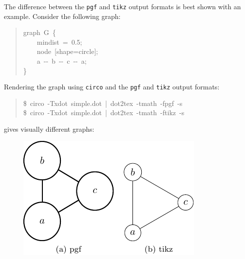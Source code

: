 \documentclass[10pt,a4paper,english]{article}
\begin{document}
The difference between the \texttt{pgf} and \texttt{tikz} output formats is best shown with an example. Consider the following graph:
\begin{quote}{\ttfamily \raggedright \noindent
graph~G~{\{}~\\
~~~~mindist~=~0.5;~\\
~~~~node~{[}shape=circle{]};~\\
~~~~a~-{}-~b~-{}-~c~-{}-~a;~\\
{\}}
}\end{quote}

Rendering the graph using \texttt{circo} and the \texttt{pgf} and \texttt{tikz} output formats:
\begin{quote}{\ttfamily \raggedright \noindent
{\$}~circo~-Txdot~simple.dot~|~dot2tex~-tmath~-fpgf~-s~\\
{\$}~circo~-Txdot~simple.dot~|~dot2tex~-tmath~-ftikz~-s
}\end{quote}

gives visually different graphs:
\begin{figure}[H]
\centering

\includegraphics{pdf/pgftikzsimple}
\end{figure}
\end{document}
